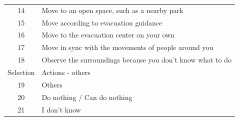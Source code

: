 \begin{table}[h]
\begin{tabular}{c|l}
 14            & Move to an open space, such as a nearby park \\
 15            & Move according to evacuation guidance \\
 16            & Move to the evacuation center on your own \\
 17            & Move in sync with the movements of people around you \\
 18            & Observe the surroundings because you don't know what to do \\
 \hline
 Selection  & Actions - others \\
 \hline
 19            & Others \\
 20            & Do nothing / Can do nothing \\
 21            & I don't know \\
 \hline
  \end{tabular}
\end{table}

